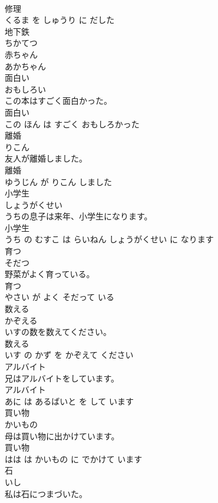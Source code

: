 \documentclass[8pt]{extreport}
\begin{document}
\begin{CJK}{UTF8}{min}
\\	修理 
\\	くるま を しゅうり に だした			
\\	地下鉄	
\\	ちかてつ			
\\	赤ちゃん	
\\	あかちゃん			
\\	面白い	
\\	おもしろい			
\\	この本はすごく面白かった。	
\\	面白い 
\\	この ほん は すごく おもしろかった			
\\	離婚	
\\	りこん			
\\	友人が離婚しました。	
\\	離婚 
\\	ゆうじん が りこん しました			
\\	小学生	
\\	しょうがくせい			
\\	うちの息子は来年、小学生になります。	
\\	小学生 
\\	うち の むすこ は らいねん しょうがくせい に なります			
\\	育つ	
\\	そだつ			
\\	野菜がよく育っている。	
\\	育つ 
\\	やさい が よく そだって いる			
\\	数える	
\\	かぞえる			
\\	いすの数を数えてください。	
\\	数える 
\\	いす の かず を かぞえて ください			
\\	アルバイト	
\\	兄はアルバイトをしています。	
\\	アルバイト 
\\	あに は あるばいと を して います			
\\	買い物	
\\	かいもの			
\\	母は買い物に出かけています。	
\\	買い物 
\\	はは は かいもの に でかけて います			
\\	石	
\\	いし			
\\	私は石につまづいた。	

\end{CJK}
\end{document}
